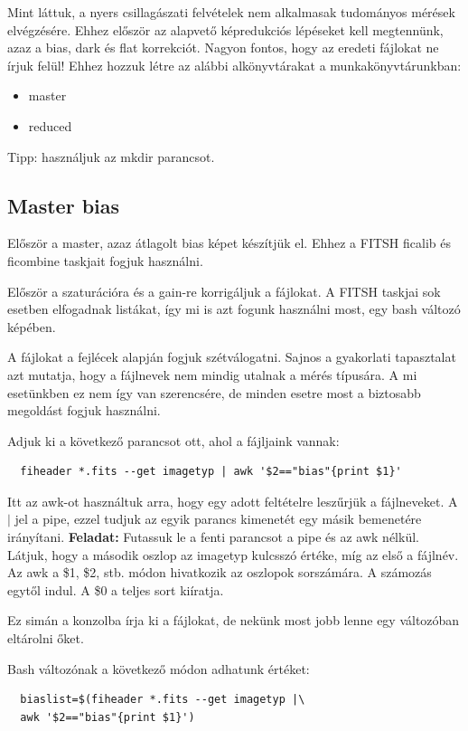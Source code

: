 \documentclass{article}
\begin{document}
Mint láttuk, a nyers csillagászati felvételek nem alkalmasak tudományos mérések
elvégzésére. Ehhez először az alapvető képredukciós lépéseket kell megtennünk,
azaz a bias, dark és flat korrekciót.
Nagyon fontos, hogy az eredeti fájlokat ne írjuk felül!
Ehhez hozzuk létre az alábbi alkönyvtárakat a munkakönyvtárunkban:
\begin{itemize}
  \item master
  \item reduced
\end{itemize}
Tipp: használjuk az mkdir parancsot.

\subsection{Master bias}
Először a master, azaz átlagolt bias képet készítjük el. Ehhez a FITSH ficalib
és ficombine taskjait fogjuk használni.

Először a szaturációra és a gain-re korrigáljuk a fájlokat. A FITSH taskjai sok
esetben elfogadnak listákat, így mi is azt fogunk használni most, egy bash
változó képében.

A fájlokat a fejlécek alapján fogjuk szétválogatni. Sajnos a gyakorlati
tapasztalat azt mutatja, hogy a fájlnevek nem mindig utalnak a mérés típusára.
A mi esetünkben ez nem így van szerencsére, de minden esetre most a biztosabb
megoldást fogjuk használni.

Adjuk ki a következő parancsot ott, ahol a fájljaink vannak:
\begin{verbatim}
  fiheader *.fits --get imagetyp | awk '$2=="bias"{print $1}'
\end{verbatim}

Itt az awk-ot használtuk arra, hogy egy adott feltételre leszűrjük a
fájlneveket. A $|$ jel a pipe, ezzel tudjuk az egyik parancs kimenetét egy
másik bemenetére irányítani.
{\bf Feladat:}
Futassuk le a fenti parancsot a pipe és az awk nélkül. Látjuk, hogy a második
oszlop az imagetyp kulcsszó értéke, míg az első a fájlnév. Az awk a \$1, \$2,
stb. módon hivatkozik az oszlopok sorszámára. A számozás egytől indul. A \$0 a
teljes sort kiíratja.

Ez simán a konzolba írja ki a fájlokat, de nekünk most jobb lenne egy
változóban eltárolni őket.

Bash változónak a következő módon adhatunk értéket:
\begin{verbatim}
  biaslist=$(fiheader *.fits --get imagetyp |\
  awk '$2=="bias"{print $1}')
\end{verbatim}
\end{document}
